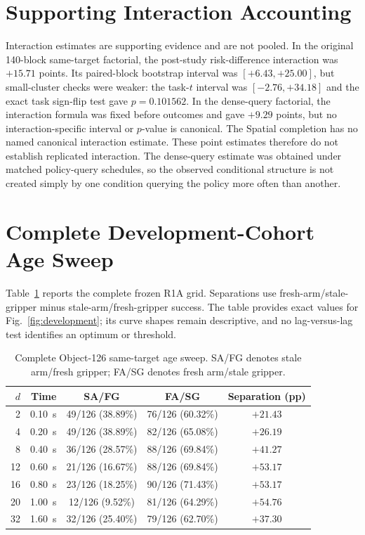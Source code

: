 \appendices
\section{Supporting Interaction Accounting}

Interaction estimates are supporting evidence and are not pooled. In the
original 140-block same-target factorial, the post-study risk-difference
interaction was $+15.71$ points. Its paired-block bootstrap interval was
$[+6.43,+25.00]$, but small-cluster checks were weaker: the task-$t$ interval
was $[-2.76,+34.18]$ and the exact task sign-flip test gave $p=0.101562$. In
the dense-query factorial, the interaction formula was fixed before outcomes
and gave $+9.29$ points, but no interaction-specific interval or $p$-value is
canonical. The Spatial completion has no named canonical interaction estimate.
These point estimates therefore do not establish replicated interaction.
The dense-query estimate was obtained under matched policy-query schedules, so
the observed conditional structure is not created simply by one condition
querying the policy more often than another.

\section{Complete Development-Cohort Age Sweep}

Table~\ref{tab:r1a-full} reports the complete frozen R1A grid. Separations use
fresh-arm/stale-gripper minus stale-arm/fresh-gripper success. The table
provides exact values for Fig.~\ref{fig:development}; its curve shapes remain
descriptive, and no lag-versus-lag test identifies an optimum or threshold.

\begin{table}[t]
\centering
\caption{Complete Object-126 same-target age sweep. SA/FG denotes stale
arm/fresh gripper; FA/SG denotes fresh arm/stale gripper.}
\label{tab:r1a-full}
\scriptsize
\setlength{\tabcolsep}{2pt}
\begin{tabular*}{\columnwidth}{@{\extracolsep{\fill}}rrccc}
\toprule
$d$ & Time & SA/FG & FA/SG & Separation (pp) \\
\midrule
2  & 0.10~s & 49/126 (38.89\%) & 76/126 (60.32\%) & $+21.43$ \\
4  & 0.20~s & 49/126 (38.89\%) & 82/126 (65.08\%) & $+26.19$ \\
8  & 0.40~s & 36/126 (28.57\%) & 88/126 (69.84\%) & $+41.27$ \\
12 & 0.60~s & 21/126 (16.67\%) & 88/126 (69.84\%) & $+53.17$ \\
16 & 0.80~s & 23/126 (18.25\%) & 90/126 (71.43\%) & $+53.17$ \\
20 & 1.00~s & 12/126 (9.52\%)  & 81/126 (64.29\%) & $+54.76$ \\
32 & 1.60~s & 32/126 (25.40\%) & 79/126 (62.70\%) & $+37.30$ \\
\bottomrule
\end{tabular*}
\end{table}

